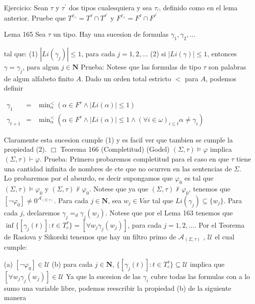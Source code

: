 Ejercicio: Sean \(\tau \) y \(\tau ^{\prime }\) dos tipos cualesquiera y sea \(\tau _{\cap }\) definido como en el lema anterior. Pruebe que \(T^{\tau _{\cap }}=T^{\tau }\cap T^{\tau ^{\prime }}\) y \(F^{\tau _{\cap }}=F^{\tau }\cap F^{\tau ^{\prime }}\)

Lema 165 Sea \(\tau \) un tipo. Hay una sucesion de formulas
\(\displaystyle \gamma _{1},\gamma _{2},... \)

tal que:
(1) \(\left\vert Li(\gamma _{j})\right\vert \leq 1\), para cada \( j=1,2,...\)
(2) si \(\left\vert Li(\gamma )\right\vert \leq 1\), entonces \(\gamma =\gamma _{j}\), para algun \(j\in \mathbf{N}\)
Prueba: Notese que las formulas de tipo \(\tau \) son palabras de algun alfabeto finito \(A\). Dado un orden total estricto \(< \) para \(A\), podemos definir

\(\displaystyle \begin{array}{rcl} \gamma _{1} & =& \min\nolimits_{\alpha }^{< }\left( \alpha \in F^{\tau }\wedge \left\vert Li(\alpha )\right\vert \leq 1\right) \\ \gamma _{t+1} & =& \min\nolimits_{\alpha }^{< }\left( \alpha \in F^{\tau }\wedge \left\vert Li(\alpha )\right\vert \leq 1\wedge (\forall i\in \omega )_{i\leq t}\alpha \neq \gamma _{i}\right) \end{array} \)

Claramente esta sucesion cumple (1) y es facil ver que tambien se cumple la propiedad (2). \(\Box\)
Teorema 166 (Completitud) (Godel) \((\Sigma ,\tau )\models \varphi \) implica \( (\Sigma ,\tau )\vdash \varphi .\)
Prueba: Primero probaremos completitud para el caso en que \(\tau \) tiene una cantidad infinita de nombres de cte que no ocurren en las sentencias de \( \Sigma \). Lo probaremos por el absurdo, es decir supongamos que \(\varphi _{0} \) es tal que \((\Sigma ,\tau )\models \varphi _{0}\) y \((\Sigma ,\tau )\not\vdash \varphi _{0}.\) Notese que ya que \((\Sigma ,\tau )\not\vdash \varphi _{0}\), tenemos que \([\lnot \varphi _{0}]\not=0^{\mathcal{A}_{(\Sigma ,\tau )}}.\) Para cada \(j\in \mathbf{N}\), sea \(w_{j}\in Var\) tal que \( Li(\gamma _{j})\subseteq \{w_{j}\}\). Para cada \(j\), declaremos \(\gamma _{j}=_{d}\gamma _{j}(w_{j})\). Notese que por el Lema 163 tenemos que \(\inf \{[\gamma _{j}(t)]:t\in T_{c}^{\tau }\}=[\forall w_{j}\gamma _{j}(w_{j})]\), para cada \(j=1,2,...\). Por el Teorema de Rasiova y Sikorski tenemos que hay un filtro primo de \(\mathcal{A}_{(\Sigma ,\tau )}\) , \(\mathcal{U}\) el cual cumple:

(a) \([\lnot \varphi _{0}]\in \mathcal{U}\)
(b) para cada \(j\in \mathbf{N}\), \(\{[\gamma _{j}(t)]:t\in T_{c}^{\tau }\}\subseteq \mathcal{U}\) implica que \([\forall w_{j}\gamma _{j}(w_{j})]\in \mathcal{U}\)
Ya que la sucesion de las \(\gamma _{i}\) cubre todas las formulas con a lo sumo una variable libre, podemos reescribir la propiedad (b) de la siguiente manera

